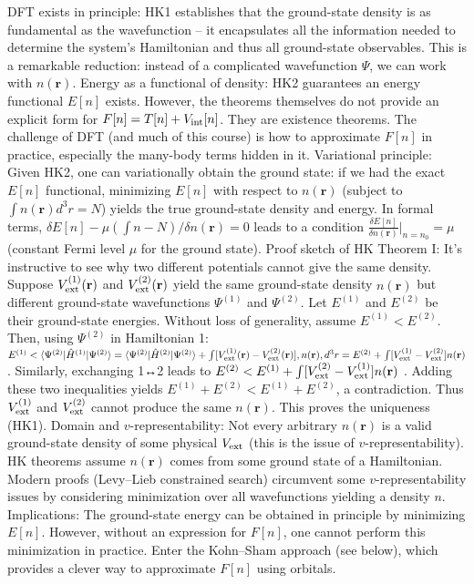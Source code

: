 DFT exists in principle: HK1 establishes that the ground-state density is as fundamental as the wavefunction – it encapsulates all the information needed to determine the system’s Hamiltonian and thus all ground-state observables. This is a remarkable reduction: instead of a complicated wavefunction $\Psi$, we can work with $n(\mathbf{r})$.
Energy as a functional of density: HK2 guarantees an energy functional $E[n]$ exists. However, the theorems themselves do not provide an explicit form for $F[n] = T[n] + V_{\rm int}[n]$. They are existence theorems. The challenge of DFT (and much of this course) is how to approximate $F[n]$ in practice, especially the many-body terms hidden in it.
Variational principle: Given HK2, one can variationally obtain the ground state: if we had the exact $E[n]$ functional, minimizing $E[n]$ with respect to $n(\mathbf{r})$ (subject to $\int n(\mathbf{r}) d^3r = N$) yields the true ground-state density and energy. In formal terms, $\delta {E[n] - \mu(\int n - N)} / \delta n(\mathbf{r}) = 0$ leads to a condition $\frac{\delta E[n]}{\delta n(\mathbf{r})}\big|_{n=n_0} = \mu$ (constant Fermi level $\mu$ for the ground state).
Proof sketch of HK Theorem I: It’s instructive to see why two different potentials cannot give the same density. Suppose $V_{\rm ext}^{(1)}(\mathbf{r})$ and $V_{\rm ext}^{(2)}(\mathbf{r})$ yield the same ground-state density $n(\mathbf{r})$ but different ground-state wavefunctions $\Psi^{(1)}$ and $\Psi^{(2)}$. Let $E^{(1)}$ and $E^{(2)}$ be their ground-state energies. Without loss of generality, assume $E^{(1)} < E^{(2)}$. Then, using $\Psi^{(2)}$ in Hamiltonian 1: $E^{(1)} < \langle \Psi^{(2)}|\hat{H}^{(1)}|\Psi^{(2)}\rangle = \langle \Psi^{(2)}|\hat{H}^{(2)}|\Psi^{(2)}\rangle + \int [V_{\rm ext}^{(1)}(\mathbf{r})-V_{\rm ext}^{(2)}(\mathbf{r})],n(\mathbf{r}),d^3r = E^{(2)} + \int [V_{\rm ext}^{(1)}-V_{\rm ext}^{(2)}] n(\mathbf{r})$ . Similarly, exchanging 1↔2 leads to $E^{(2)} < E^{(1)} + \int [V_{\rm ext}^{(2)}-V_{\rm ext}^{(1)}] n(\mathbf{r})$ . Adding these two inequalities yields $E^{(1)} + E^{(2)} < E^{(1)} + E^{(2)}$, a contradiction. Thus $V_{\rm ext}^{(1)}$ and $V_{\rm ext}^{(2)}$ cannot produce the same $n(\mathbf{r})$. This proves the uniqueness (HK1).
Domain and $v$-representability: Not every arbitrary $n(\mathbf{r})$ is a valid ground-state density of some physical $V_{\rm ext}$ (this is the issue of $v$-representability). HK theorems assume $n(\mathbf{r})$ comes from some ground state of a Hamiltonian. Modern proofs (Levy–Lieb constrained search) circumvent some $v$-representability issues by considering minimization over all wavefunctions yielding a density $n$.
Implications: The ground-state energy can be obtained in principle by minimizing $E[n]$. However, without an expression for $F[n]$, one cannot perform this minimization in practice. Enter the Kohn–Sham approach (see below), which provides a clever way to approximate $F[n]$ using orbitals. 

